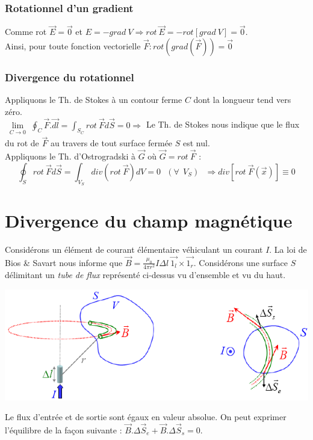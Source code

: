 \documentclass	[11pt, a4paper, openany]{book}
\begin{document}
\subsubsection{Rotationnel d'un gradient}
Comme rot $\vec{E} = \vec{0}$ et $E = - grad\ V \Rightarrow rot\ \vec{E} = -rot[grad\ V] = \vec{0}$.\\
Ainsi, pour toute fonction vectorielle $\vec{F} : rot(grad(\vec{F})) = \vec{0}$

\subsubsection{Divergence du rotationnel}
Appliquons le Th. de Stokes à un contour ferme $C$ dont la longueur tend vers zéro.\\
$\lim\limits_{\substack{C \to 0}} \oint_C \vec{F}.\vec{dl} = \int_{S_C} rot\ \vec{F} d\vec{S} = 0 \Rightarrow$ Le Th. de Stokes nous indique que le flux du rot de $\vec{F}$ au travers de tout surface fermée $S$ est nul.\\
Appliquons le Th. d'Ostrogradski à $\vec{G}$ où $\vec{G} = rot\ \vec{F}$ :
\begin{equation}
\oint_S rot\ \vec{F}d\vec{S} = \int_{V_S} div(rot\ \vec{F})dV = 0\ \ \ (\forall\ \ V_S)\ \ \ \Rightarrow div[rot\ \vec{F}(\vec{x})] \equiv 0
\end{equation}


\section{Divergence du champ magnétique}
Considérons un élément de courant élémentaire véhiculant un courant $I$. La loi de Bios \& Savart nous informe que $\vec{B} = \frac{\mu_0}{4\pi r^2}I\Delta l\ \vec{1_l} \times \vec{1_r}$. Considérons une surface $S$ délimitant un \textit{tube de flux} représenté ci-dessus vu d'ensemble et vu du  haut.
\begin{center}
\includegraphics[scale=0.60]{magneto/image20.png}\\
\end{center}
Le flux d'entrée et de sortie sont égaux en valeur absolue. On peut exprimer l'équilibre de la façon suivante : $\vec{B}.\Delta\vec{S}_e + \vec{B}.\Delta\vec{S}_s = 0$.\\
\end{document}
